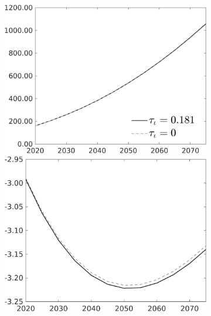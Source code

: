 \begin{figure}[h!!]
\begin{subfigure}{0.75\textwidth}
\begin{minipage}[]{0.32\textwidth}
	\end{minipage}
	\begin{minipage}[]{0.32\textwidth}
	\includegraphics[width=1\textwidth]{../../codding_model/own_basedOnFried/optimalPol_010922_revision/figures/all_13Sept22/PerdifNoTauf_Equlab_regime5_CompTaul_G_spillover0_nsk0_xgr0_knspil1_sep0_LFlimit0_emsbase0_countec0_GovRev0_etaa0.79_lgd1.png}
\end{minipage}
	\begin{minipage}[]{0.32\textwidth}
		\includegraphics[width=1\textwidth]{../../codding_model/own_basedOnFried/optimalPol_010922_revision/figures/all_13Sept22/PerdifNoTauf_Equlab_regime0_CompTaul_EY_spillover0_nsk0_xgr0_knspil1_sep0_LFlimit0_emsbase0_countec0_GovRev0_etaa0.79_lgd0.png}

\end{minipage}
\end{subfigure}
\end{figure}
